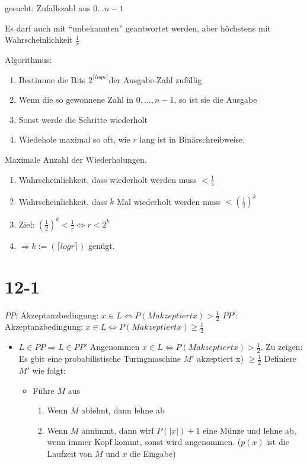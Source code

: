 \documentclass[12pt, oneside, a4paper, numbers=enddot, abstracton, parskip=full]{scrreprt}
\begin{document}
gesucht: Zufallszahl aus $0 \dots n-1$

Es darf auch mit ``unbekannten'' geantwortet werden, aber höchstens mit Wahrscheinlichkeit $\frac{1}{r}$

Algorithmus:
\begin{enumerate}
\item Bestimme die Bits $2^{\lceil log n  \rceil }$der Ausgabe-Zahl zufällig
\item Wenn die so gewonnene Zahl in ${0, \dots,n-1}$, so ist sie die Ausgabe 
\item Sonst werde die Schritte wiederholt
\item Wiedehole maximal so oft, wie $r$ lang ist in Binärschreibweise.
\end{enumerate}

Maximale Anzahl der Wiederholungen.
\begin{enumerate}
\item Wahrscheinlichkeit, dass wiederholt werden muss $<\frac{1}{5}$
\item Wahrscheinlichkeit, dass $k$ Mal wiederholt werden muss $<(\frac{1}{2})^k$
\item Ziel: $(\frac{1}{2})^k < \frac{1}{r} \Leftrightarrow r<2^k$
\item $\Rightarrow k := (\lceil log r \rceil )$ genügt.
\end{enumerate}
\section{12-1}
$PP$: Akzeptanzbedingung: $x \in L \Leftrightarrow P(M akzeptiert x) > \frac{1}{2}$
$PP'$: Akzeptanzbedingung: $x \in L \Leftrightarrow P(M akzeptiert x) \geq \frac{1}{2}$

\begin{itemize}
\item $L \in PP \Rightarrow L \in PP'$
  Angenommen $x \in L \Leftrightarrow P (M akzeptiert x) > \frac{1}{2}$. Zu zeigen: Es gbit eine probabilistische Turingmaschine $M'$ akzeptiert x) $\geq \frac{1}{2}$
  Definiere $M'$ wie folgt:
  \begin{itemize}
  \item Führe $M$ aus
    \begin{enumerate}
    \item Wenn $M$ ablehnt, dann lehne ab
    \item Wenn $M$ annimmt, dann wirf $P(|x|) + 1$ eine Münze und lehne ab,
      wenn immer Kopf kommt, sonst wird angenommen. ($p(x)$ ist die Laufzeit von $M$ und $x$ die Eingabe)
    \end{enumerate}
  \end{itemize}
\end{itemize}
\end{document}
